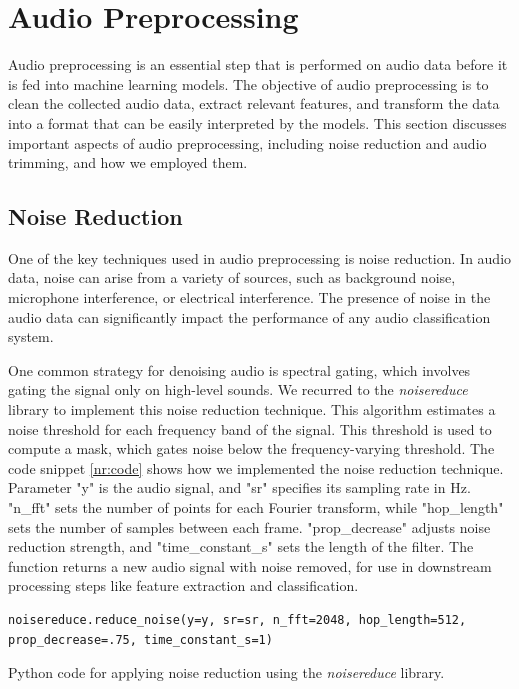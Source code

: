 \section{Audio Preprocessing}


Audio preprocessing is an essential step that is performed on audio data before it is fed into machine learning models. The objective of audio preprocessing is to clean the collected audio data, extract relevant features, and transform the data into a format that can be easily interpreted by the models. This section discusses important aspects of audio preprocessing, including noise reduction and audio trimming, and how we employed them.

\subsection{Noise Reduction}

One of the key techniques used in audio preprocessing is noise reduction. In audio data, noise can arise from a variety of sources, such as background noise, microphone interference, or electrical interference. The presence of noise in the audio data can significantly impact the performance of any audio classification system.

One common strategy for denoising audio is spectral gating, which involves gating the signal only on high-level sounds. We recurred to the \textit{noisereduce} library to implement this noise reduction technique.
This algorithm estimates a noise threshold for each frequency band of the signal. This threshold is used to compute a mask, which gates noise below the frequency-varying threshold. The code snippet \ref{nr:code} shows how we implemented the noise reduction technique. Parameter "y" is the audio signal, and "sr" specifies its sampling rate in Hz. "n\_fft" sets the number of points for each Fourier transform, while "hop\_length" sets the number of samples between each frame. "prop\_decrease" adjusts noise reduction strength, and "time\_constant\_s" sets the length of the filter. The function returns a new audio signal with noise removed, for use in downstream processing steps like feature extraction and classification.

\begin{listing}[H]
	\begin{verbatim}
noisereduce.reduce_noise(y=y, sr=sr, n_fft=2048, hop_length=512, prop_decrease=.75, time_constant_s=1)
	\end{verbatim}
	\caption{Python code for applying noise reduction using the \textit{noisereduce} library.}
	\label{nr:code}
\end{listing}

